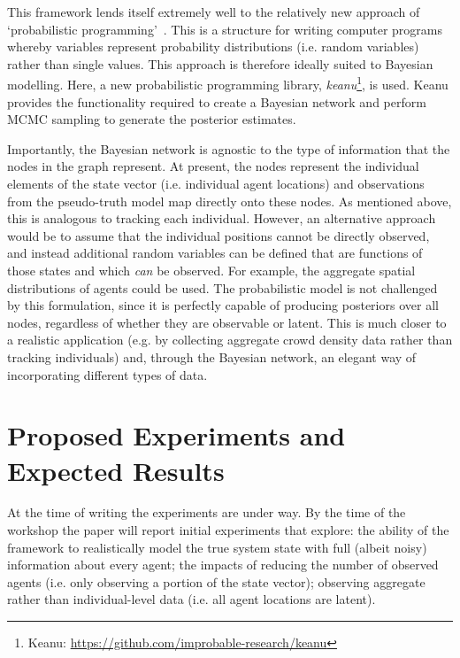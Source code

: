 \documentclass[runningheads]{llncs}
\begin{document}
This framework lends itself extremely well to the relatively new approach of `probabilistic programming'~\cite{ghahramani_bayesian_2012,ghahramani_probabilistic_2015}. This is a structure for writing computer programs whereby variables represent probability distributions (i.e. random variables) rather than single values. This approach is therefore ideally suited to Bayesian modelling. Here, a new probabilistic programming library, \textit{keanu}\footnote{Keanu: \url{https://github.com/improbable-research/keanu}}, is used. Keanu provides the functionality required to create a Bayesian network and perform MCMC sampling to generate the posterior estimates. 

Importantly, the Bayesian network is agnostic to the type of information that the nodes in the graph represent. At present, the nodes represent the individual elements of the state vector (i.e. individual agent locations) and observations from the pseudo-truth model map directly onto these nodes. As mentioned above, this is analogous to tracking each individual. However, an alternative approach would be to assume that the individual positions cannot be directly observed, and instead additional random variables can be defined that are functions of those states and which \textit{can} be observed. For example, the aggregate spatial distributions of agents could be used. The probabilistic model is not challenged by this formulation, since it is perfectly capable of producing posteriors over all nodes, regardless of whether they are observable or latent. This is much closer to a realistic application (e.g. by collecting aggregate crowd density data rather than tracking individuals) and, through the Bayesian network, an elegant way of incorporating different types of data. 


\section{Proposed Experiments and Expected Results} 

At the time of writing the experiments are under way. By the time of the workshop the paper will report initial experiments that explore: the ability of the framework to realistically model the true system state with full (albeit noisy) information about every agent; the impacts of reducing the number of observed agents (i.e. only observing a portion of the state vector); observing aggregate rather than individual-level data (i.e. all agent locations are latent).




\newpage
{} %


\end{document}
